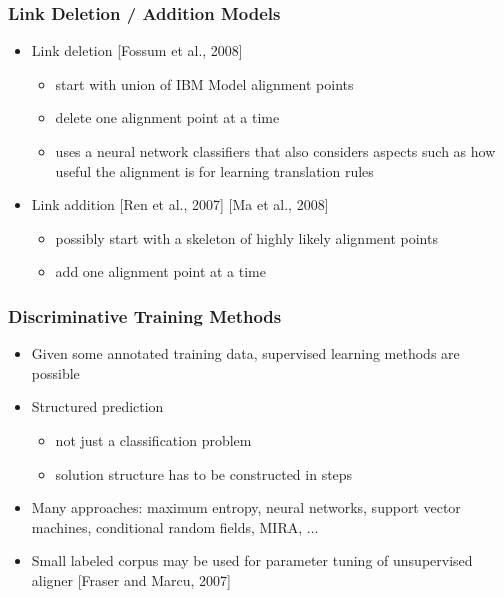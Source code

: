  
\begin{frame}
\frametitle{Link Deletion / Addition Models\koehnref}

\begin{itemize}
\item Link deletion [Fossum et al., 2008]
\begin{itemize}
\item start with union of IBM Model alignment points
\item delete one alignment point at a time
\item uses a neural network classifiers that also considers aspects such as how useful the alignment is for learning translation rules
\end{itemize}
\vspace{5mm}
\item Link addition [Ren et al., 2007] [Ma et al., 2008]
\begin{itemize}
\item possibly start with a skeleton of highly likely alignment points
\item add one alignment point at a time
\end{itemize}
\end{itemize}

\end{frame}

 
\begin{frame}
\frametitle{Discriminative Training Methods\koehnref}

\begin{itemize}
\item Given some annotated training data, supervised learning methods are possible
\item Structured prediction
\begin{itemize}
\item not just a classification problem
\item solution structure has to be constructed in steps
\end{itemize}
\item Many approaches: maximum entropy, neural networks, support vector machines, conditional random fields, MIRA, ...
\item Small labeled corpus may be used for parameter tuning of unsupervised aligner [Fraser and Marcu, 2007]
\end{itemize}

\end{frame}

